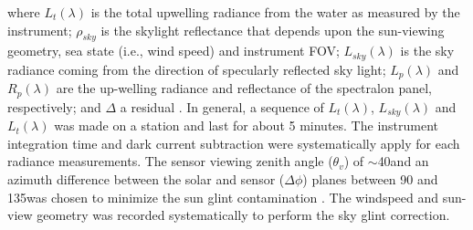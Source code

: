 \documentclass[essd, manuscript]{copernicus}
\begin{document}
where $L_t(\lambda)$ is the total upwelling radiance from the water as measured by the instrument; $\rho_{sky}$ is the skylight reflectance that depends upon the sun-viewing geometry, sea state (i.e., wind speed) and instrument FOV; $L_{sky}(\lambda)$ is the sky radiance coming from the direction of specularly reflected sky light; $L_p(\lambda)$ and $R_p(\lambda)$ are the up-welling radiance and reflectance of the spectralon panel, respectively; and $\Delta$ a residual . In general, a sequence of $L_t(\lambda)$, $L_{sky}(\lambda)$  and $L_t(\lambda)$ was made on a station and last for about 5 minutes. The instrument integration time and dark current subtraction were systematically apply for each radiance measurements. The sensor viewing zenith angle ($\theta_v$) of $\sim$40\degree and an azimuth difference between the solar and sensor ($\Delta\phi$) planes between 90 and 135\degree was chosen to minimize the sun glint contamination \citep{Mobley1999}. The windspeed and sun-view geometry was recorded systematically to perform the sky glint correction.   \\
\end{document}
